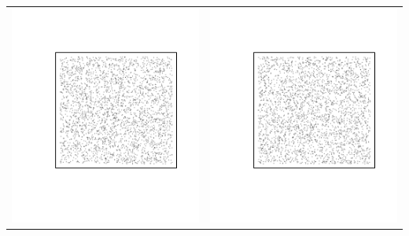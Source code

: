 \documentclass{article}\usepackage{graphicx, color}
\makeatletter
\def\maxwidth{ %
  \ifdim\Gin@nat@width>\linewidth
    \linewidth
  \else
    \Gin@nat@width
  \fi
}
\newenvironment{knitrout}{}{} %
\makeatother
\begin{document}
\vspace*{-1.75in}
\begin{tabular}{cc}
\begin{knitrout}
\definecolor{shadecolor}{rgb}{0.969, 0.969, 0.969}\color{fgcolor}\includegraphics[width=\maxwidth]{figure/unnamed-chunk-39} 
\end{knitrout}

&
\begin{knitrout}
\definecolor{shadecolor}{rgb}{0.969, 0.969, 0.969}\color{fgcolor}\includegraphics[width=\maxwidth]{figure/unnamed-chunk-40} 
\end{knitrout}

\\
\end{tabular}
\end{document}
